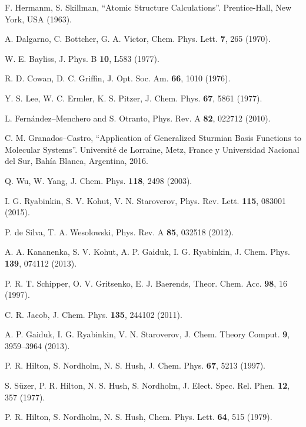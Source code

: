 \begin{thebibliography}{9}
F. Hermanm, S. Skillman,
``Atomic Structure Calculations''. 
Prentice-Hall, New York, USA (1963).

A. Dalgarno, C. Bottcher, G. A. Victor, 
Chem. Phys. Lett. \textbf{7}, 265 (1970).

W. E. Bayliss,
J. Phys. B \textbf{10}, L583 (1977).

R. D. Cowan, D. C. Griffin, 
J. Opt. Soc. Am. \textbf{66}, 1010 (1976).

Y. S. Lee, W. C. Ermler, K. S. Pitzer, 
J. Chem. Phys. \textbf{67}, 5861 (1977).

L. Fernández--Menchero and S. Otranto, 
Phys. Rev. A {\bf 82}, 022712 (2010).

C. M. Granados--Castro, 
``Application of Generalized Sturmian Basis Functions to
Molecular Systems''. 
Universit\'e de Lorraine, Metz, France y Universidad Nacional del Sur, Bah\'ia Blanca, Argentina, 2016.


Q. Wu, W. Yang,
J. Chem. Phys. \textbf{118}, 2498 (2003).

I. G. Ryabinkin, S. V. Kohut, V. N. Staroverov,
Phys. Rev. Lett. \textbf{115}, 083001 (2015).

P. de Silva, T. A. Wesolowski,
Phys. Rev. A \textbf{85}, 032518 (2012).

A. A. Kananenka, S. V. Kohut, A. P. Gaiduk, I. G. Ryabinkin, 
J. Chem. Phys. \textbf{139}, 074112 (2013).

P. R. T. Schipper, O. V. Gritsenko, E. J. Baerends,
Theor. Chem. Acc. \textbf{98}, 16 (1997).

C. R. Jacob,
J. Chem. Phys. \textbf{135}, 244102 (2011).

A. P. Gaiduk, I. G. Ryabinkin, V. N. Staroverov, 
J. Chem. Theory Comput. \textbf{9}, 3959--3964 (2013).

P. R. Hilton, S. Nordholm, N. S. Hush, 
J. Chem. Phys. \textbf{67}, 5213 (1997).

S. S{\"u}zer, P. R. Hilton, N. S. Hush, S. Nordholm,
J. Elect. Spec. Rel. Phen. \textbf{12}, 357 (1977).

P. R. Hilton, S. Nordholm, N. S. Hush,
Chem. Phys. Lett. \textbf{64}, 515 (1979).


\end{thebibliography}
